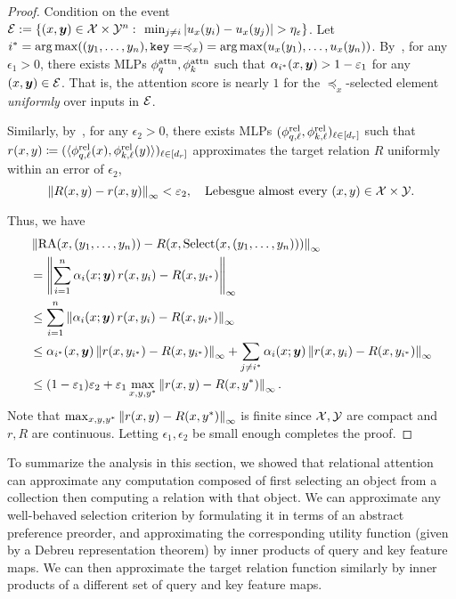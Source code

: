 \begin{proof}
  Condition on the event ${\mathcal{E}} := \{(x, \bm{y}) \in {\mathcal{X}} \times {\mathcal{Y}}^n \,\colon\, \min_{j \neq i} \left\lvert u_x(y_i) - u_x(y_j)\right\rvert > \eta_\varepsilon\}$. Let $i^* = \operatorname*{arg\,max}((y_1, \ldots, y_n), \mathtt{key} = \preccurlyeq_x) = \operatorname*{arg\,max}(u_x(y_1), \ldots, u_x(y_n))$. By~\citep[Theorem 5.1]{altabaaApproximationRelationFunctions2024}, for any $\epsilon_1 > 0$, there exists MLPs $\phi_q^{\mathrm{attn}}, \phi_k^{\mathrm{attn}}$ such that $\alpha_{i^*}(x, \bm{y}) > 1 - \varepsilon_1$ for any $(x, \bm{y}) \in {\mathcal{E}}$. That is, the attention score is nearly $1$ for the $\preceq_x$-selected element \textit{uniformly} over inputs in ${\mathcal{E}}$.

  Similarly, by~\citep[Theorem 3.1]{altabaaApproximationRelationFunctions2024}, for any $\epsilon_2 > 0$, there exists MLPs $(\phi_{q, \ell}^{\mathrm{rel}}, \phi_{k, \ell}^{\mathrm{rel}})_{\ell \in [d_r]}$ such that $r(x, y) \coloneq (\langle \phi_{q, \ell}^{\mathrm{rel}}(x), \phi_{k, \ell}^{\mathrm{rel}}(y) \rangle)_{\ell \in [d_r]}$ approximates the target relation $R$ uniformly within an error of $\epsilon_2$,
  \begin{equation*}
    \left\lVert R(x, y) - r(x, y)\right\rVert_{\infty} < \varepsilon_2, \quad \text{Lebesgue almost every } (x, y) \in {\mathcal{X}} \times {\mathcal{Y}}.
  \end{equation*}

  Thus, we have
  \begin{align*}
    &\left\lVert\mathrm{RA}(x, (y_1, \ldots, y_n)) - R(x, \mathrm{Select}(x, (y_1, \ldots, y_n)))\right\rVert_{\infty} \\
    &= \left\lVert\sum_{i=1}^{n} \alpha_i(x; \bm{y}) \,r(x, y_i) - R(x, y_{i^*})\right\rVert_{\infty} \\
    &\leq \sum_{i=1}^{n} \left\lVert\alpha_i(x; \bm{y}) \,r(x, y_i) - R(x, y_{i^*})\right\rVert_{\infty} \\
    &\leq \alpha_{i^*}(x, \bm{y}) \left\lVert r(x, y_{i^*}) - R(x, y_{i^*})\right\rVert_{\infty} + \sum_{j \neq i^*} \alpha_i(x; \bm{y}) \left\lVert r(x, y_i) - R(x, y_{i^*})\right\rVert_{\infty}\\
    &\leq (1 - \varepsilon_1) \varepsilon_2 + \varepsilon_1 \max_{x, y, y^*} \left\lVert r(x, y) - R(x, y^{*})\right\rVert_{\infty}.
  \end{align*}
  Note that $\max_{x, y, y^*} \left\lVert r(x, y) - R(x, y^*)\right\rVert_{\infty}$ is finite since ${\mathcal{X}}, {\mathcal{Y}}$ are compact and $r, R$ are continuous. Letting $\epsilon_1, \epsilon_2$ be small enough completes the proof.
\end{proof}

To summarize the analysis in this section, we showed that relational attention can approximate any computation composed of first selecting an object from a collection then computing a relation with that object. We can approximate any well-behaved selection criterion by formulating it in terms of an abstract preference preorder, and approximating the corresponding utility function (given by a Debreu representation theorem) by inner products of query and key feature maps. We can then approximate the target relation function similarly by inner products of a different set of query and key feature maps.

